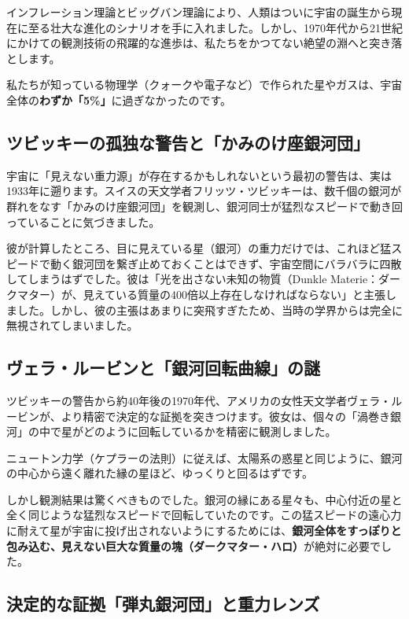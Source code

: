 インフレーション理論とビッグバン理論により、人類はついに宇宙の誕生から現在に至る壮大な進化のシナリオを手に入れました。しかし、1970年代から21世紀にかけての観測技術の飛躍的な進歩は、私たちをかつてない絶望の淵へと突き落とします。

私たちが知っている物理学（クォークや電子など）で作られた星やガスは、宇宙全体の\textbf{わずか「5\%」}に過ぎなかったのです。

\subsection{ツビッキーの孤独な警告と「かみのけ座銀河団」}

宇宙に「見えない重力源」が存在するかもしれないという最初の警告は、実は1933年に遡ります。スイスの天文学者フリッツ・ツビッキーは、数千個の銀河が群れをなす「かみのけ座銀河団」を観測し、銀河同士が猛烈なスピードで動き回っていることに気づきました。

彼が計算したところ、目に見えている星（銀河）の重力だけでは、これほど猛スピードで動く銀河団を繋ぎ止めておくことはできず、宇宙空間にバラバラに四散してしまうはずでした。彼は「光を出さない未知の物質（Dunkle Materie：ダークマター）が、見えている質量の400倍以上存在しなければならない」と主張しました。しかし、彼の主張はあまりに突飛すぎたため、当時の学界からは完全に無視されてしまいました。

\subsection{ヴェラ・ルービンと「銀河回転曲線」の謎}

ツビッキーの警告から約40年後の1970年代、アメリカの女性天文学者ヴェラ・ルービンが、より精密で決定的な証拠を突きつけます。彼女は、個々の「渦巻き銀河」の中で星がどのように回転しているかを精密に観測しました。

ニュートン力学（ケプラーの法則）に従えば、太陽系の惑星と同じように、銀河の中心から遠く離れた縁の星ほど、ゆっくりと回るはずです。

しかし観測結果は驚くべきものでした。銀河の縁にある星々も、中心付近の星と全く同じような猛烈なスピードで回転していたのです。この猛スピードの遠心力に耐えて星が宇宙に投げ出されないようにするためには、\textbf{銀河全体をすっぽりと包み込む、見えない巨大な質量の塊（ダークマター・ハロ）}が絶対に必要でした。

\subsection{決定的な証拠「弾丸銀河団」と重力レンズ}

